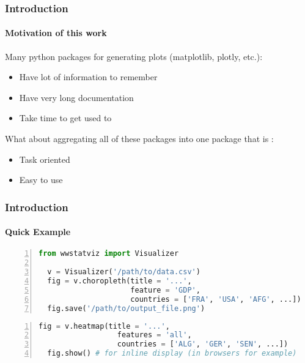 \begin{frame}
  \frametitle{Introduction}
  \framesubtitle{Motivation of this work}


  Many python packages for generating plots (matplotlib, plotly, etc.):
  \begin{itemize}
    \item Have lot of information to remember
    \item Have very long documentation
    \item Take time to get used to
  \end{itemize}

  \vspace{10mm}


  What about aggregating all of these packages into one package that is :
  \begin{itemize}
      \item Task oriented
      \item Easy to use 
  \end{itemize}
\end{frame}

\begin{frame}[fragile,shrink=30]
  \frametitle{Introduction}
  \framesubtitle{Quick Example}
 
  \begin{lstlisting}[language=Python,numbers=left]
  from wwstatviz import Visualizer

  v = Visualizer('/path/to/data.csv')
  fig = v.choropleth(title = '...', 
                     feature = 'GDP',
                     countries = ['FRA', 'USA', 'AFG', ...])
  fig.save('/path/to/output_file.png')
  \end{lstlisting}

  \begin{lstlisting}[language=Python,numbers=left]
  fig = v.heatmap(title = '...',
                  features = 'all',
                  countries = ['ALG', 'GER', 'SEN', ...])
  fig.show() # for inline display (in browsers for example)
  \end{lstlisting}
\end{frame}